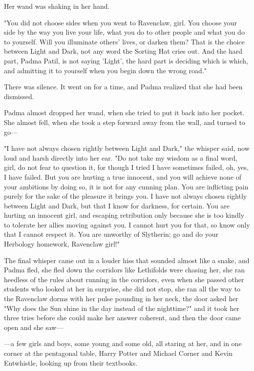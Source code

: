 Her wand was shaking in her hand.

"You did not choose sides when you went to Ravenclaw, girl. You choose your 
side by the way you live your life, what you do to other people and what you do 
to yourself. Will you illuminate others' lives, or darken them? That is the 
choice between Light and Dark, not any word the Sorting Hat cries out. And the 
hard part, Padma Patil, is not saying 'Light', the hard part is deciding which 
is which, and admitting it to yourself when you begin down the wrong road."

There was silence. It went on for a time, and Padma realized that she had been 
dismissed.

Padma almost dropped her wand, when she tried to put it back into her pocket. 
She almost fell, when she took a step forward away from the wall, and turned to 
go---

"I have not always chosen rightly between Light and Dark," the whisper said, 
now loud and harsh directly into her ear. "Do not take my wisdom as a final 
word, girl, do not fear to question it, for though I tried I have sometimes 
failed, oh, yes, I have failed. But you are hurting a true innocent, and you 
will achieve none of your ambitions by doing so, it is not for any cunning 
plan. You are inflicting pain purely for the sake of the pleasure it brings 
you. I have not always chosen rightly between Light and Dark, but that I know 
for darkness, for certain. You are hurting an innocent girl, and escaping 
retribution only because she is too kindly to tolerate her allies moving 
against you. I cannot hurt you for that, so know only that I cannot respect it. 
You are unworthy of Slytherin; go and do your Herbology homework, Ravenclaw 
girl!"

The final whisper came out in a louder hiss that sounded almost like a snake, 
and Padma fled, she fled down the corridors like Lethifolds were chasing her, 
she ran heedless of the rules about running in the corridors, even when she 
passed other students who looked at her in surprise, she did not stop, she ran 
all the way to the Ravenclaw dorms with her pulse pounding in her neck, the 
door asked her "Why does the Sun shine in the day instead of the nighttime?" 
and it took her three tries before she could make her answer coherent, and then 
the door came open and she saw---

---a few girls and boys, some young and some old, all staring at her, and in 
one corner at the pentagonal table, Harry Potter and Michael Corner and Kevin 
Entwhistle, looking up from their textbooks.

